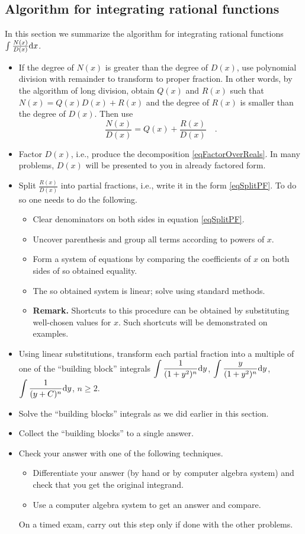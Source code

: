 \documentclass[12pt]{book}
\begin{document}
\subsection{Algorithm for integrating rational functions}
In this section we summarize the algorithm for integrating rational functions $\int \frac{N(x)}{D(x)}{\normalfont \text{d}} x$.
\begin{itemize}
\item If the degree of $N(x)$ is greater than the degree of $D(x)$, use polynomial division with remainder to transform to proper fraction. In other words, by the algorithm of long division, obtain $Q(x)$ and $R(x)$ such that $N(x)= Q(x)D(x)+R(x)$ and the degree of $R(x)$ is smaller than the degree of $D(x)$. Then use
\[
\frac{N(x)}{D(x)}=Q(x) +\frac{R(x)}{D(x)}\quad .
\]
\item Factor $D(x)$, i.e., produce the decomposition \eqref{eqFactorOverReals}. In many problems, $D(x)$ will be presented to you in already factored form.
\item Split $\frac{R(x)}{D(x)}$ into partial fractions, i.e., write it in the form \eqref{eqSplitPF}. To do so one needs to do the following.
\begin{itemize}
\item Clear denominators on both sides in equation \eqref{eqSplitPF}.
\item Uncover parenthesis and group all terms according to powers of $x$. 
\item Form a system of equations by comparing the coefficients of $x$ on both sides of so obtained equality.
\item The so obtained system is linear; solve using standard methods.
\item \textbf{Remark.} Shortcuts to this procedure can be obtained by substituting well-chosen values for $x$. Such shortcuts will be demonstrated on examples.
\end{itemize}
\item Using linear substitutions, transform each partial fraction into a multiple of one of the ``building block'' integrals $\displaystyle \int \frac{1}{(1+y^2)^n}{\normalfont \text{d}} y$, $\displaystyle \int \frac{y}{(1+y^2)^n}{\normalfont \text{d}} y$, $\displaystyle \int \frac{1}{(y+C)^n}{\normalfont \text{d}} y$, $n\geq 2$.
\item Solve the ``building blocks'' integrals as we did earlier in this section.
\item Collect the ``building blocks'' to a single answer.
\item Check your answer with one of the following techniques.
\begin{itemize}
\item Differentiate your answer (by hand or by computer algebra system) and check that you get the original integrand.
\item Use a computer algebra system to get an answer and compare.
\end{itemize}
On a timed exam, carry out this step only if done with the other problems.
\end{itemize}
\end{document}
